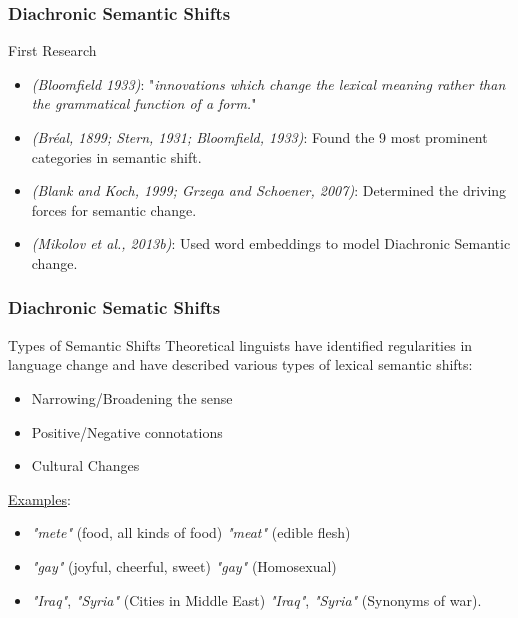 \documentclass[
    11pt, %
    aspectratio=169, %
]{beamer}
\begin{document}
\begin{frame}
    \frametitle{Diachronic Semantic Shifts}
    \begin{exampleblock}{First Research}
        \begin{itemize}
            \item \textit{(Bloomfield 1933)}: "\textit{innovations which change the lexical meaning rather than the grammatical function of a form.}"
            \item \textit{(Bréal, 1899; Stern, 1931; Bloomfield, 1933)}: Found the 9 most prominent categories in semantic shift.
            \item \textit{(Blank and Koch, 1999; Grzega and Schoener, 2007)}: Determined the driving forces for semantic change.
            \item \textit{(Mikolov et al., 2013b)}: Used word embeddings to model Diachronic Semantic change.
        \end{itemize}
    \end{exampleblock}

    
\end{frame}

\begin{frame}
    \frametitle{Diachronic Sematic Shifts}
    \begin{block}{Types of Semantic Shifts}
        Theoretical linguists have identified regularities in language change and have described various types of lexical semantic shifts:
    \begin{itemize}
        \item Narrowing/Broadening the sense 
        \item Positive/Negative connotations
        \item Cultural Changes
    \end{itemize}
    \end{block}
    \underline{Examples}:
    \begin{itemize}
        \item \textit{"mete"} (food, all kinds of food)       \textit{"meat"} (edible flesh)
        \item \textit{"gay"} (joyful, cheerful, sweet) \textit{"gay"} (Homosexual)
        \item \textit{"Iraq"}, \textit{"Syria"} (Cities in Middle East) \textit{"Iraq"}, \textit{"Syria"} (Synonyms of war).
    \end{itemize}
    
\end{frame}
\end{document}
